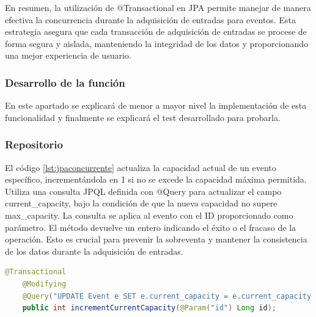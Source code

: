 En resumen, la utilización de @Transactional en JPA permite manejar de manera efectiva la concurrencia durante la adquisición de entradas para eventos. Esta estrategia
asegura que cada transacción de adquisición de entradas se procese de forma segura y aislada, manteniendo la integridad de los datos y proporcionando una mejor experiencia de
usuario.

\subsubsection{Desarrollo de la función}
En este apartado se explicará de menor a mayor nivel la implementación de esta funcionalidad y finalmente se explicará el test desarrollado para probarla.

\subsubsection*{Repositorio}
El código \ref{lst:jpaconcurrente} actualiza la capacidad actual de un evento específico, incrementándola en 1 si no se excede la capacidad máxima permitida. 
Utiliza una consulta JPQL definida con @Query para actualizar el campo current\_capacity, bajo la condición de que la nueva capacidad no supere max\_capacity. 
La consulta se aplica al evento con el ID proporcionado como parámetro. El método devuelve un entero indicando el éxito o el fracaso de la operación. Esto es crucial para
prevenir la sobreventa y mantener la consistencia de los datos durante la adquisición de entradas.

\myjavastyle
\begin{lstlisting}[language=Java, caption=Función incrementCurrentCapacity, label=lst:jpaconcurrente]
    @Transactional
    @Modifying
    @Query("UPDATE Event e SET e.current_capacity = e.current_capacity + 1 WHERE e.id = :id AND e.current_capacity + 1  <= e.max_capacity")
    public int incrementCurrentCapacity(@Param("id") Long id);
\end{lstlisting}

